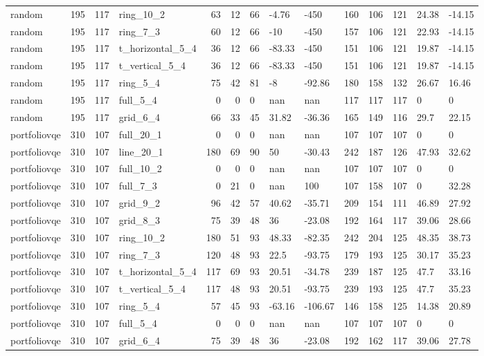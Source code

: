 \begin{longtable}{lrrlrrlllrrlll}
random & 195 & 117 & ring\_10\_2 & 63 & 12 & 66 & -4.76 & -450 & 160 & 106 & 121 & 24.38 & -14.15 \\
random & 195 & 117 & ring\_7\_3 & 60 & 12 & 66 & -10 & -450 & 157 & 106 & 121 & 22.93 & -14.15 \\
random & 195 & 117 & t\_horizontal\_5\_4 & 36 & 12 & 66 & -83.33 & -450 & 151 & 106 & 121 & 19.87 & -14.15 \\
random & 195 & 117 & t\_vertical\_5\_4 & 36 & 12 & 66 & -83.33 & -450 & 151 & 106 & 121 & 19.87 & -14.15 \\
random & 195 & 117 & ring\_5\_4 & 75 & 42 & 81 & -8 & -92.86 & 180 & 158 & 132 & 26.67 & 16.46 \\
random & 195 & 117 & full\_5\_4 & 0 & 0 & 0 & nan & nan & 117 & 117 & 117 & 0 & 0 \\
random & 195 & 117 & grid\_6\_4 & 66 & 33 & 45 & 31.82 & -36.36 & 165 & 149 & 116 & 29.7 & 22.15 \\
portfoliovqe & 310 & 107 & full\_20\_1 & 0 & 0 & 0 & nan & nan & 107 & 107 & 107 & 0 & 0 \\
portfoliovqe & 310 & 107 & line\_20\_1 & 180 & 69 & 90 & 50 & -30.43 & 242 & 187 & 126 & 47.93 & 32.62 \\
portfoliovqe & 310 & 107 & full\_10\_2 & 0 & 0 & 0 & nan & nan & 107 & 107 & 107 & 0 & 0 \\
portfoliovqe & 310 & 107 & full\_7\_3 & 0 & 21 & 0 & nan & 100 & 107 & 158 & 107 & 0 & 32.28 \\
portfoliovqe & 310 & 107 & grid\_9\_2 & 96 & 42 & 57 & 40.62 & -35.71 & 209 & 154 & 111 & 46.89 & 27.92 \\
portfoliovqe & 310 & 107 & grid\_8\_3 & 75 & 39 & 48 & 36 & -23.08 & 192 & 164 & 117 & 39.06 & 28.66 \\
portfoliovqe & 310 & 107 & ring\_10\_2 & 180 & 51 & 93 & 48.33 & -82.35 & 242 & 204 & 125 & 48.35 & 38.73 \\
portfoliovqe & 310 & 107 & ring\_7\_3 & 120 & 48 & 93 & 22.5 & -93.75 & 179 & 193 & 125 & 30.17 & 35.23 \\
portfoliovqe & 310 & 107 & t\_horizontal\_5\_4 & 117 & 69 & 93 & 20.51 & -34.78 & 239 & 187 & 125 & 47.7 & 33.16 \\
portfoliovqe & 310 & 107 & t\_vertical\_5\_4 & 117 & 48 & 93 & 20.51 & -93.75 & 239 & 193 & 125 & 47.7 & 35.23 \\
portfoliovqe & 310 & 107 & ring\_5\_4 & 57 & 45 & 93 & -63.16 & -106.67 & 146 & 158 & 125 & 14.38 & 20.89 \\
portfoliovqe & 310 & 107 & full\_5\_4 & 0 & 0 & 0 & nan & nan & 107 & 107 & 107 & 0 & 0 \\
portfoliovqe & 310 & 107 & grid\_6\_4 & 75 & 39 & 48 & 36 & -23.08 & 192 & 162 & 117 & 39.06 & 27.78 \\
\end{longtable}
